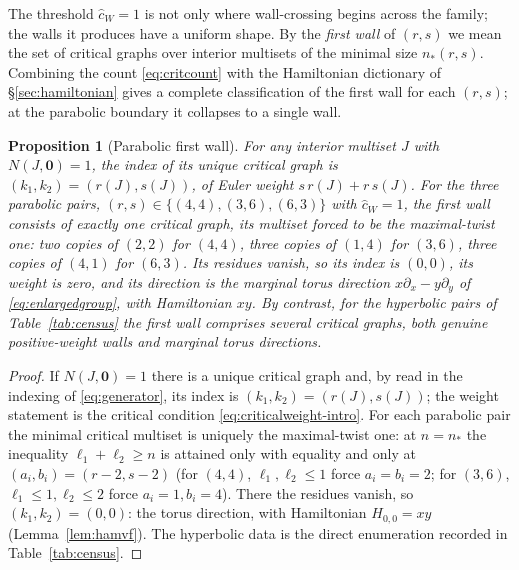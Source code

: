 \documentclass[11pt]{amsart}
\newtheorem{proposition}[theorem]{Proposition}
\theoremstyle{definition}
\theoremstyle{remark}
\newcommand{\chat}{\hat{c}}
\begin{document}
The threshold $\chat_{W}=1$ is not only where wall-crossing begins across the
family; the walls it produces have a uniform shape. By the \emph{first wall}
of $(r,s)$ we mean the set of critical graphs over interior multisets of the
minimal size $n_{*}(r,s)$. Combining the count
\eqref{eq:critcount} with the Hamiltonian dictionary of \S\ref{sec:hamiltonian}
gives a complete classification of the first wall for each $(r,s)$; at the
parabolic boundary it collapses to a single wall.

\begin{proposition}[Parabolic first wall]
\label{prop:parabolic}
For any interior multiset $J$ with $N(J,\mathbf 0)=1$, the index of its unique
critical graph is $(k_{1},k_{2})=(r(J),s(J))$, of Euler weight
$s\,r(J)+r\,s(J)$. For the
three parabolic pairs, $(r,s)\in\{(4,4),(3,6),(6,3)\}$ with $\chat_{W}=1$, the
first wall consists of exactly one critical graph, its multiset forced to be
the maximal-twist one: two copies of $(2,2)$ for $(4,4)$, three copies of
$(1,4)$ for $(3,6)$, three copies of $(4,1)$ for $(6,3)$. Its residues vanish,
so its index is $(0,0)$, its weight is zero, and its direction is the
\emph{marginal torus direction} $x\partial_{x}-y\partial_{y}$ of
\eqref{eq:enlargedgroup}, with Hamiltonian $xy$. By contrast, for the
hyperbolic pairs of Table~\ref{tab:census} the first wall comprises several
critical graphs, both genuine positive-weight walls and marginal torus
directions.
\end{proposition}

\begin{proof}
If $N(J,\mathbf 0)=1$ there is a unique critical graph and, by
\cite[Notation~2.40, eqn.~(2.31)]{GKT} read in the indexing of
\eqref{eq:generator}, its index is $(k_{1},k_{2})=(r(J),s(J))$; the weight
statement is the critical condition \eqref{eq:criticalweight-intro}. For each parabolic pair
the minimal critical multiset is uniquely the maximal-twist one: at $n=n_{*}$
the inequality $\ell_{1}+\ell_{2}\geq n$ is attained only with equality and
only at $(a_{i},b_{i})=(r-2,s-2)$ (for $(4,4)$, $\ell_{1},\ell_{2}\leq1$ force
$a_{i}=b_{i}=2$; for $(3,6)$, $\ell_{1}\leq1,\ell_{2}\leq2$ force
$a_{i}=1,b_{i}=4$). There the residues vanish, so $(k_{1},k_{2})=(0,0)$: the
torus direction, with Hamiltonian $H_{0,0}=xy$ (Lemma~\ref{lem:hamvf}). The
hyperbolic data is the direct enumeration recorded in Table~\ref{tab:census}.
\end{proof}
\end{document}
